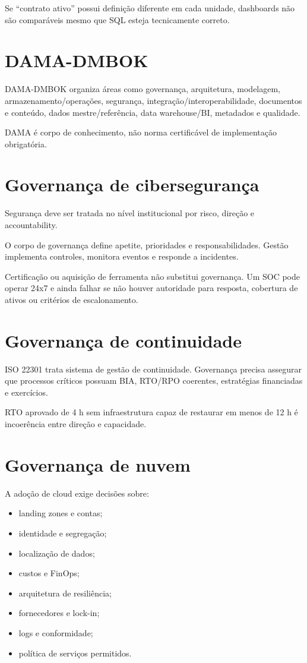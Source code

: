 Se ``contrato ativo'' possui definição diferente em cada unidade, dashboards não são comparáveis mesmo que SQL esteja tecnicamente correto.

\section{DAMA-DMBOK}

DAMA-DMBOK organiza áreas como governança, arquitetura, modelagem, armazenamento/operações, segurança, integração/interoperabilidade, documentos e conteúdo, dados mestre/referência, data warehouse/BI, metadados e qualidade.

DAMA é corpo de conhecimento, não norma certificável de implementação obrigatória.

\section{Governança de cibersegurança}

Segurança deve ser tratada no nível institucional por risco, direção e accountability.

O corpo de governança define apetite, prioridades e responsabilidades. Gestão implementa controles, monitora eventos e responde a incidentes.

Certificação ou aquisição de ferramenta não substitui governança. Um SOC pode operar 24x7 e ainda falhar se não houver autoridade para resposta, cobertura de ativos ou critérios de escalonamento.

\section{Governança de continuidade}

ISO 22301 trata sistema de gestão de continuidade. Governança precisa assegurar que processos críticos possuam BIA, RTO/RPO coerentes, estratégias financiadas e exercícios.

RTO aprovado de 4 h sem infraestrutura capaz de restaurar em menos de 12 h é incoerência entre direção e capacidade.

\section{Governança de nuvem}

A adoção de cloud exige decisões sobre:
\begin{itemize}
\item landing zones e contas;
\item identidade e segregação;
\item localização de dados;
\item custos e FinOps;
\item arquitetura de resiliência;
\item fornecedores e lock-in;
\item logs e conformidade;
\item política de serviços permitidos.
\end{itemize}

